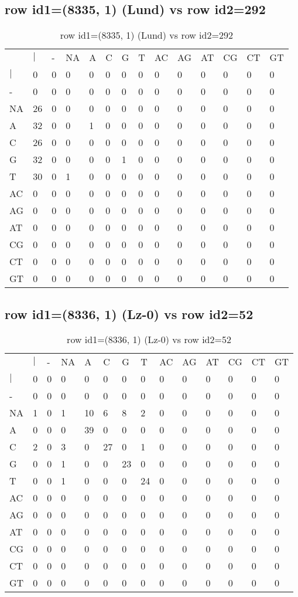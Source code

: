 \subsection{row id1=(8335, 1) (Lund) vs row id2=292}
\begin{center}
\begin{longtable}{|l|l|l|l|l|l|l|l|l|l|l|l|l|l|}
\caption{row id1=(8335, 1) (Lund) vs row id2=292} \label{table_dm342}\\
\hline
\\
\hline
&$|$&-&NA&A&C&G&T&AC&AG&AT&CG&CT&GT\\
$|$&0&0&0&0&0&0&0&0&0&0&0&0&0\\
-&0&0&0&0&0&0&0&0&0&0&0&0&0\\
NA&26&0&0&0&0&0&0&0&0&0&0&0&0\\
A&32&0&0&1&0&0&0&0&0&0&0&0&0\\
C&26&0&0&0&0&0&0&0&0&0&0&0&0\\
G&32&0&0&0&0&1&0&0&0&0&0&0&0\\
T&30&0&1&0&0&0&0&0&0&0&0&0&0\\
AC&0&0&0&0&0&0&0&0&0&0&0&0&0\\
AG&0&0&0&0&0&0&0&0&0&0&0&0&0\\
AT&0&0&0&0&0&0&0&0&0&0&0&0&0\\
CG&0&0&0&0&0&0&0&0&0&0&0&0&0\\
CT&0&0&0&0&0&0&0&0&0&0&0&0&0\\
GT&0&0&0&0&0&0&0&0&0&0&0&0&0\\
\hline
\end{longtable}
\end{center}

\subsection{row id1=(8336, 1) (Lz-0) vs row id2=52}
\begin{center}
\begin{longtable}{|l|l|l|l|l|l|l|l|l|l|l|l|l|l|}
\caption{row id1=(8336, 1) (Lz-0) vs row id2=52} \label{table_dm344}\\
\hline
\\
\hline
&$|$&-&NA&A&C&G&T&AC&AG&AT&CG&CT&GT\\
$|$&0&0&0&0&0&0&0&0&0&0&0&0&0\\
-&0&0&0&0&0&0&0&0&0&0&0&0&0\\
NA&1&0&1&10&6&8&2&0&0&0&0&0&0\\
A&0&0&0&39&0&0&0&0&0&0&0&0&0\\
C&2&0&3&0&27&0&1&0&0&0&0&0&0\\
G&0&0&1&0&0&23&0&0&0&0&0&0&0\\
T&0&0&1&0&0&0&24&0&0&0&0&0&0\\
AC&0&0&0&0&0&0&0&0&0&0&0&0&0\\
AG&0&0&0&0&0&0&0&0&0&0&0&0&0\\
AT&0&0&0&0&0&0&0&0&0&0&0&0&0\\
CG&0&0&0&0&0&0&0&0&0&0&0&0&0\\
CT&0&0&0&0&0&0&0&0&0&0&0&0&0\\
GT&0&0&0&0&0&0&0&0&0&0&0&0&0\\
\hline
\end{longtable}
\end{center}

